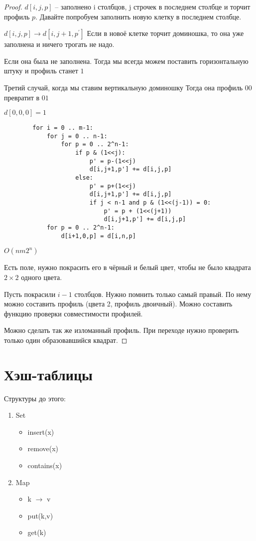 \documentclass{book}
\newcommand{\p}[1]{#1^{\prime}}
\theoremstyle{definition}
\begin{document}
\begin{proof}
    $d[i,j,p]$ -- заполнено i столбцов, j строчек в последнем столбце и торчит профиль  $p$. Давайте попробуем заполнить новую клетку в последнем столбце.

    $d[i,j,p] \to d[i,j+1,\p p]$ Если в новоё клетке торчит доминошка, то она уже заполнена и ничего трогать не надо.

    Если она была не заполнена. Тогда мы всегда можем поставить горизонтальную штуку и профиль станет $1$

    Третий случай, когда мы ставим вертикальную доминошку Тогда она профиль  $00$ превратит в  $01$

    $d[0,0,0] = 1$

     \begin{verbatim}
        for i = 0 .. m-1:
            for j = 0 .. n-1:
                for p = 0 .. 2^n-1:
                    if p & (1<<j):
                        p' = p-(1<<j)
                        d[i,j+1,p'] += d[i,j,p]
                    else:
                        p' = p+(1<<j)
                        d[i,j+1,p'] += d[i,j,p]
                        if j < n-1 and p & (1<<(j-1)) = 0:
                            p' = p + (1<<(j+1))
                            d[i,j+1,p'] += d[i,j,p]
            for p = 0 .. 2^n-1:
                d[i+1,0,p] = d[i,n,p]
    \end{verbatim}      
    $O(nm2^n)$

    Есть поле, нужно покрасить его в чёрный и белый цвет, чтобы не было квадрата $2\times 2$ одного цвета.

    Пусть покрасили $i-1$ столбцов. Нужно помнить только самый правый. По нему можно составить профиль (цвета 2, профиль двоичный). Можно составить функцию проверки совместимости профилей.

    Можно сделать так же изломанный профиль. При переходе нужно проверить только один образовавшийся квадрат.

\end{proof}

\section{Хэш-таблицы}

Структуры до этого:
\begin{enumerate}
    \item Set
        \begin{itemize}
            \item insert(x)
            \item remove(x)
            \item contains(x)
        \end{itemize}
    \item Map
        \begin{itemize}
            \item k $\to $ v
            \item put(k,v)
            \item get(k)
        \end{itemize}
\end{enumerate}
\end{document}
